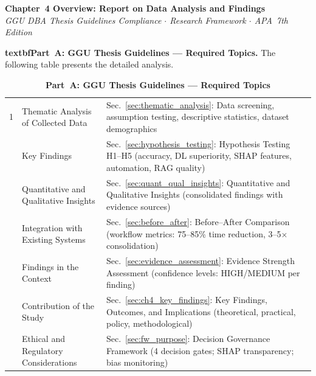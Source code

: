 
\thispagestyle{plain}

\begin{center}
{\large\bfseries\color{ggunavy} Chapter~4 Overview: Report on Data Analysis and Findings}\\[0.2cm]
{\small\textit{GGU DBA Thesis Guidelines Compliance $\cdot$ Research Framework $\cdot$ APA~7th Edition}}
\end{center}

\vspace{0.3cm}

\noindent\textbf{textbfPart~A: GGU Thesis Guidelines --- Required Topics.} The following table presents the detailed analysis.

\begin{table}[H]
\caption{Appendix Ch4 Ggu Checklist Table 1}
\tablestripes
\caption*{\textbf{Part~A: GGU Thesis Guidelines --- Required Topics}}
\tablefontsize
\begin{tabularx}{\textwidth}{@{} p{0.4cm} L L @{}}
\toprule
\thead{\#} &  &  \\
 & Thematic Analysis of Collected Data & Sec.~\ref{sec:thematic_analysis}: Data screening, assumption testing, descriptive statistics, dataset demographics \\
 & Key Findings & Sec.~\ref{sec:hypothesis_testing}: Hypothesis Testing H1--H5 (accuracy, DL superiority, SHAP features, automation, RAG quality) \\
 & Quantitative and Qualitative Insights & Sec.~\ref{sec:quant_qual_insights}: Quantitative and Qualitative Insights (consolidated findings with evidence sources) \\
 & Integration with Existing Systems & Sec.~\ref{sec:before_after}: Before--After Comparison (workflow metrics: 75--85\% time reduction, 3--5$\times$ consolidation) \\
 & Findings in the Context & Sec.~\ref{sec:evidence_assessment}: Evidence Strength Assessment (confidence levels: HIGH/MEDIUM per finding) \\
 & Contribution of the Study & Sec.~\ref{sec:ch4_key_findings}: Key Findings, Outcomes, and Implications (theoretical, practical, policy, methodological) \\
 & Ethical and Regulatory Considerations & Sec.~\ref{sec:fw_purpose}: Decision Governance Framework (4 decision gates; SHAP transparency; bias monitoring) \\
\bottomrule
\end{tabularx}
\end{table}

